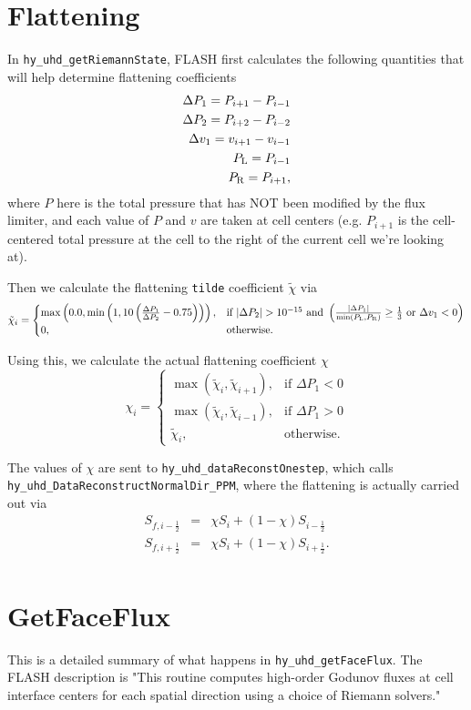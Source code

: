 \documentclass[preprint,11pt]{aastex}
\newcommand{\bea}{\begin{eqnarray}}
\newcommand{\eea}{\end{eqnarray}}
\begin{document}
\section{Flattening}
\label{sec:flattening}
In \verb!hy_uhd_getRiemannState!, FLASH first calculates the following quantities that will help determine flattening coefficients
\bea
\Delta P_1 = P_{i+1} - P_{i-1} \\
\Delta P_2 = P_{i+2} - P_{i-2} \\
\Delta v_1 = v_{i+1} - v_{i-1} \\
P_{\rm L}  = P_{i-1} \\
P_{\rm R}  = P_{i+1},
\eea
where $P$ here is the total pressure that has NOT been modified by the flux limiter, and each value of $P$ and $v$ are taken at cell centers (e.g. $P_{i+1}$ is the cell-centered total pressure at the cell to the right of the current cell we're looking at).

Then we calculate the flattening \verb!tilde! coefficient $\tilde{\chi}$ via
\[
    \tilde{\chi}_i = 
\begin{cases}
		\max\left(0.0,\min\left(1,10 \left(\frac{\Delta P_1}{\Delta P_2} - 0.75\right)\right)\right),& \text{if } |\Delta P_2| > 10^{-15} \text{ and }\left(\frac{|\Delta P_1|}{\min(P_{\rm L}, P_{\rm R})} \geq \frac{1}{3}\text{ or }\Delta v_1 < 0\right)\\
    0,              & \text{otherwise}.
\end{cases}
\]

Using this, we calculate the actual flattening coefficient $\chi$
\[
    \chi_i = 
\begin{cases}
		\max \left( \tilde{\chi}_i,\tilde{\chi}_{i+1} \right),& \text{if } \Delta P_1 < 0 \\
		\max \left( \tilde{\chi}_i,\tilde{\chi}_{i-1} \right),& \text{if } \Delta P_1 > 0 \\
    \tilde{\chi}_i,              & \text{otherwise}.
\end{cases}
\]

The values of $\chi$ are sent to \verb!hy_uhd_dataReconstOnestep!, which calls \verb!hy_uhd_DataReconstructNormalDir_PPM!, where the flattening is actually carried out via
\bea
S_{f,i-\frac{1}{2}} &=& \chi S_i + (1 - \chi) S_{i-\frac{1}{2}}  \\
S_{f,i+\frac{1}{2}} &=& \chi S_i + (1 - \chi) S_{i+\frac{1}{2}}. \\
\eea

\section{GetFaceFlux}
\label{sec:getfaceflux}
This is a detailed summary of what happens in \verb!hy_uhd_getFaceFlux!.  The FLASH description is "This routine computes high-order Godunov fluxes at cell interface centers for each spatial direction using a choice of Riemann solvers."
\end{document}
